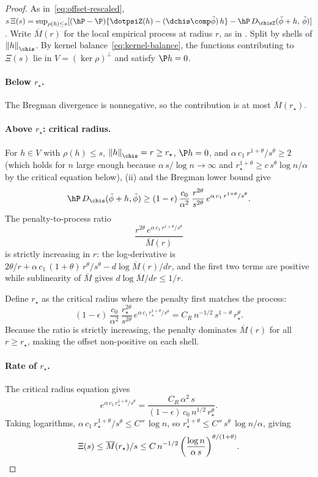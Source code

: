 \documentclass{article}
\begin{document}
\begin{proof}
As in~\eqref{eq:offset-rescaled},
$s\,\Xi(s) = \sup_{\rho(h) \le s}
  [(\hP - \P)\{\dotpsiZ(h) - (\dchis \comp \tilde\phi)\, h\}
    - \hP\, D_{\chisZ}(\tilde\phi + h,\, \tilde\phi)]$.
Write $\overline{M}(r)$ for the local empirical process
at radius $r$, as in .
Split by shells of $\norm{h}_{\chis}$.
By kernel balance~\eqref{eq:kernel-balance},
the functions contributing to $\Xi(s)$
lie in $V = (\ker\rho)^{\perp}$
and satisfy $\P h = 0$.

\paragraph{Below $r_\star$.}
The Bregman divergence is nonnegative,
so the contribution is at most $\overline{M}(r_\star)$.

\paragraph{Above $r_\star$: critical radius.}
For $h \in V$ with $\rho(h) \le s$,
$\norm{h}_{\chis} = r \ge r_\star$,
$\P h = 0$,
and $\alpha\, c_1\, r^{1+\theta}/s^\theta \ge 2$
(which holds for $n$ large enough
because $\alpha\, s / \log n \to \infty$
and $r_\star^{1+\theta} \ge c\, s^\theta \log n / \alpha$
by the critical equation below),
(ii)
and the Bregman lower bound give
\[
\hP\, D_{\chis}(\tilde\phi + h, \tilde\phi)
  \ge (1-\epsilon)\, \frac{c_0}{\alpha^2}\,
    \frac{r^{2\theta}}{s^{2\theta}}\,
    e^{\alpha\, c_1\, r^{1+\theta}/s^\theta}.
\]
The penalty-to-process ratio
\[
\frac{r^{2\theta}\,
  e^{\alpha\, c_1\, r^{1+\theta}/s^\theta}}
  {\overline{M}(r)}
\]
is strictly increasing in $r$:
the log-derivative is
$2\theta/r
  + \alpha\, c_1\, (1+\theta)\, r^\theta/s^\theta
  - d\log\overline{M}(r)/dr$,
and the first two terms are positive
while sublinearity of $\overline{M}$
gives $d\log\overline{M}/dr \le 1/r$.

Define $r_\star$ as the critical radius
where the penalty first matches the process:
\[
(1-\epsilon)\, \frac{c_0}{\alpha^2}\,
    \frac{r_\star^{2\theta}}{s^{2\theta}}\,
    e^{\alpha\, c_1\, r_\star^{1+\theta}/s^\theta}
  = C_R\, n^{-1/2}\, s^{1-\theta}\, r_\star^\theta.
\]
Because the ratio is strictly increasing,
the penalty dominates $\overline{M}(r)$
for all $r \ge r_\star$,
making the offset non-positive on each shell.

\paragraph{Rate of $r_\star$.}
The critical radius equation gives
\[
e^{\alpha\, c_1\, r_\star^{1+\theta}/s^\theta}
  = \frac{C_R\, \alpha^2\, s}
    {(1-\epsilon)\, c_0\, n^{1/2}\, r_\star^\theta}.
\]
Taking logarithms,
$\alpha\, c_1\, r_\star^{1+\theta}/s^\theta
  \le C''\, \log n$,
so $r_\star^{1+\theta}
  \le C''\, s^\theta\, \log n / \alpha$,
giving
\[
\Xi(s)
  \le \overline{M}(r_\star)/s
  \le C\, n^{-1/2}\,
    \qty(\frac{\log n}{\alpha\, s})^{\theta/(1+\theta)}.
\qedhere
\]
\end{proof}
\end{document}
